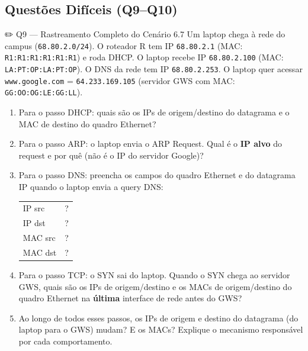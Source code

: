 \documentclass[11pt,a4paper]{article}
\begin{document}
\subsection*{Questões Difíceis (Q9--Q10)}

\begin{questao}{✏️ Q9 --- Rastreamento Completo do Cenário 6.7}
Um laptop chega à rede do campus (\texttt{68.80.2.0/24}). O roteador R tem IP \texttt{68.80.2.1} (MAC: \texttt{R1:R1:R1:R1:R1:R1}) e roda DHCP. O laptop recebe IP \texttt{68.80.2.100} (MAC: \texttt{LA:PT:OP:LA:PT:OP}). O DNS da rede tem IP \texttt{68.80.2.253}. O laptop quer acessar \texttt{www.google.com} = \texttt{64.233.169.105} (servidor GWS com MAC: \texttt{GG:OO:OG:LE:GG:LL}).
\begin{enumerate}[label=(\alph*)]
    \item Para o passo DHCP: quais são os IPs de origem/destino do datagrama e o MAC de destino do quadro Ethernet?
    \item Para o passo ARP: o laptop envia o ARP Request. Qual é o \textbf{IP alvo} do request e por quê (não é o IP do servidor Google)?
    \item Para o passo DNS: preencha os campos do quadro Ethernet e do datagrama IP quando o laptop envia a query DNS:

    \begin{center}
    \begin{tabular}{ll}
    \toprule IP src & ?\\ IP dst & ?\\ MAC src & ?\\ MAC dst & ?\\ \bottomrule
    \end{tabular}
    \end{center}

    \item Para o passo TCP: o SYN sai do laptop. Quando o SYN chega ao servidor GWS, quais são os IPs de origem/destino e os MACs de origem/destino do quadro Ethernet na \textbf{última} interface de rede antes do GWS?
    \item Ao longo de todos esses passos, os IPs de origem e destino do datagrama (do laptop para o GWS) mudam? E os MACs? Explique o mecanismo responsável por cada comportamento.
\end{enumerate}
\end{questao}
\end{document}
